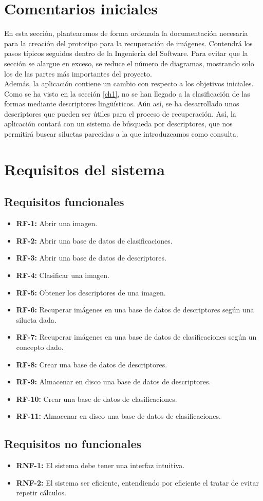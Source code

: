 \section{Comentarios iniciales}

En esta sección, plantearemos de forma ordenada la documentación necesaria para la creación del prototipo para la recuperación de imágenes. Contendrá los pasos típicos seguidos dentro de la Ingeniería del Software. Para evitar que la sección se alargue en exceso, se reduce el número de diagramas, mostrando solo los de las partes más importantes del proyecto.\\

Además, la aplicación contiene un cambio con respecto a los objetivos iniciales. Como se ha visto en la sección \ref{ch1}, no se han llegado a la clasificación de las formas mediante descriptores lingüísticos. Aún así, se ha desarrollado unos descriptores que pueden ser útiles para el proceso de recuperación. Así, la aplicación contará con un sistema de búsqueda por descriptores, que nos permitirá buscar siluetas parecidas a la que introduzcamos como consulta.\\

\section{Requisitos del sistema}

\subsection{Requisitos funcionales}

\begin{itemize}
\item \textbf{RF-1: }Abrir una imagen.
\item \textbf{RF-2: }Abrir una base de datos de clasificaciones.
\item \textbf{RF-3: }Abrir una base de datos de descriptores.
\item \textbf{RF-4: }Clasificar una imagen.
\item \textbf{RF-5: }Obtener los descriptores de una imagen.
\item \textbf{RF-6: }Recuperar imágenes en una base de datos de descriptores según una silueta dada.
\item \textbf{RF-7: }Recuperar imágenes en una base de datos de clasificaciones según un concepto dado.
\item \textbf{RF-8: }Crear una base de datos de descriptores.
\item \textbf{RF-9: }Almacenar en disco una base de datos de descriptores.
\item \textbf{RF-10: }Crear una base de datos de clasificaciones.
\item \textbf{RF-11: }Almacenar en disco una base de datos de clasificaciones.
\end{itemize}

\subsection{Requisitos no funcionales}

\begin{itemize}
\item \textbf{RNF-1: }El sistema debe tener una interfaz intuitiva.
\item \textbf{RNF-2: }El sistema ser eficiente, entendiendo por eficiente el tratar de evitar repetir cálculos.
\end{itemize}